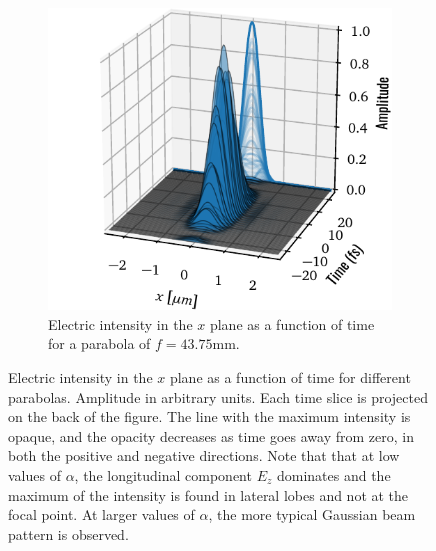 \documentclass[11pt,SymmetricalJury]{inrsthesis/inrsthesis}
\begin{document}
\begin{figure}
\begin{subfigure}{0.47\textwidth}
      \includegraphics[width=\textwidth]{figs/ElectricIntensityTimeWaterfallf0.04375.pdf}
      \caption{Electric intensity in the $x$ plane as a function of time for a parabola of $f=43.75\si{\milli\metre}$.}
      \label{fig:sc.electric_intensity_waterfall43}
    \end{subfigure}
    \caption[Transverse cut of the electric intensity in the focal plane as a function of time, $x$ plane.]
            {Electric intensity in the $x$ plane as a function of time for different parabolas.
            Amplitude in arbitrary units. Each time slice is projected on the back of the figure.
            The line with the maximum intensity is opaque, and the opacity decreases as time
            goes away from zero, in both the positive and negative directions. Note that that at
            low values of $\alpha$, the longitudinal component $E_z$ dominates and the maximum
            of the intensity is found in lateral lobes and not at the focal point. At
            larger values of $\alpha$, the more typical Gaussian beam pattern is observed.}
    \label{fig:sc.electric_intensity_waterfall}
  \end{figure}

\end{document}
